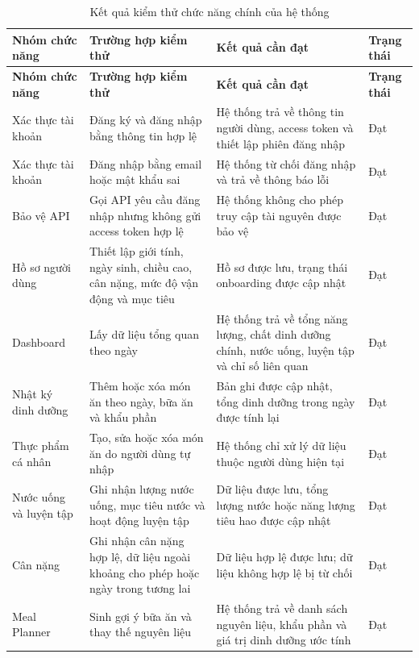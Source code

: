 \documentclass[12pt, a4paper]{report}
\begin{document}
\begin{longtable}{|>{\raggedright\arraybackslash}p{3cm}|>{\raggedright\arraybackslash}p{3cm}|>{\raggedright\arraybackslash}p{4cm}|>{\raggedright\arraybackslash}p{5cm}|}
\caption{Kết quả kiểm thử chức năng chính của hệ thống}
\label{tab:kq_kiem_thu_chuc_nang} \\
\hline
\textbf{Nhóm chức năng} & \textbf{Trường hợp kiểm thử} & \textbf{Kết quả cần đạt} & \textbf{Trạng thái} \\
\hline
\endfirsthead
\hline
\textbf{Nhóm chức năng} & \textbf{Trường hợp kiểm thử} & \textbf{Kết quả cần đạt} & \textbf{Trạng thái} \\
\hline
\endhead

Xác thực tài khoản & Đăng ký và đăng nhập bằng thông tin hợp lệ & Hệ thống trả về thông tin người dùng, access token và thiết lập phiên đăng nhập & Đạt \\
\hline
Xác thực tài khoản & Đăng nhập bằng email hoặc mật khẩu sai & Hệ thống từ chối đăng nhập và trả về thông báo lỗi & Đạt \\
\hline
Bảo vệ API & Gọi API yêu cầu đăng nhập nhưng không gửi access token hợp lệ & Hệ thống không cho phép truy cập tài nguyên được bảo vệ & Đạt \\
\hline
Hồ sơ người dùng & Thiết lập giới tính, ngày sinh, chiều cao, cân nặng, mức độ vận động và mục tiêu & Hồ sơ được lưu, trạng thái onboarding được cập nhật & Đạt \\
\hline
Dashboard & Lấy dữ liệu tổng quan theo ngày & Hệ thống trả về tổng năng lượng, chất dinh dưỡng chính, nước uống, luyện tập và chỉ số liên quan & Đạt \\
\hline
Nhật ký dinh dưỡng & Thêm hoặc xóa món ăn theo ngày, bữa ăn và khẩu phần & Bản ghi được cập nhật, tổng dinh dưỡng trong ngày được tính lại & Đạt \\
\hline
Thực phẩm cá nhân & Tạo, sửa hoặc xóa món ăn do người dùng tự nhập & Hệ thống chỉ xử lý dữ liệu thuộc người dùng hiện tại & Đạt \\
\hline
Nước uống và luyện tập & Ghi nhận lượng nước uống, mục tiêu nước và hoạt động luyện tập & Dữ liệu được lưu, tổng lượng nước hoặc năng lượng tiêu hao được cập nhật & Đạt \\
\hline
Cân nặng & Ghi nhận cân nặng hợp lệ, dữ liệu ngoài khoảng cho phép hoặc ngày trong tương lai & Dữ liệu hợp lệ được lưu; dữ liệu không hợp lệ bị từ chối & Đạt \\
\hline
Meal Planner & Sinh gợi ý bữa ăn và thay thế nguyên liệu & Hệ thống trả về danh sách nguyên liệu, khẩu phần và giá trị dinh dưỡng ước tính & Đạt \\

\end{longtable}
\end{document}

